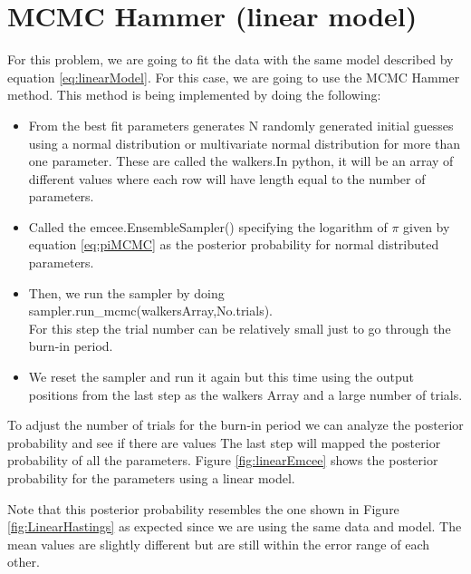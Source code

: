 \section{MCMC Hammer (linear model)}

For this problem, we are going to fit the data with the same model described by equation \ref{eq:linearModel}. For this case, we are going to use the MCMC Hammer method. This method is being implemented by doing the following:
\begin{itemize}
    \item From the best fit parameters generates N randomly generated initial guesses using a normal distribution or multivariate normal distribution for more than one parameter. These are called the walkers.In python, it will be an array of different values where each row will have length equal to the number of parameters.
    \item Called the emcee.EnsembleSampler() specifying the logarithm of $\pi$ given by equation \ref{eq:piMCMC} as the posterior probability for normal distributed parameters.
    \item Then, we run the sampler by doing \\ sampler.run\_mcmc(walkersArray,No.trials). \\
    For this step the trial number can be relatively small just to go through the burn-in period.
    \item We reset the sampler and run it again but this time using the output positions from the last step as the walkers Array and a large number of trials.
\end{itemize}

To adjust the number of trials for the burn-in period we can analyze the posterior probability and see if there are values
The last step will mapped the posterior probability of all the parameters. 
Figure \ref{fig:linearEmcee} shows the posterior probability for the parameters using a linear model.

Note that this posterior probability resembles the one shown in Figure \ref{fig:LinearHastings} as expected since we are using the same data and model. 
The mean values are slightly different but are still within the error range of each other. 


